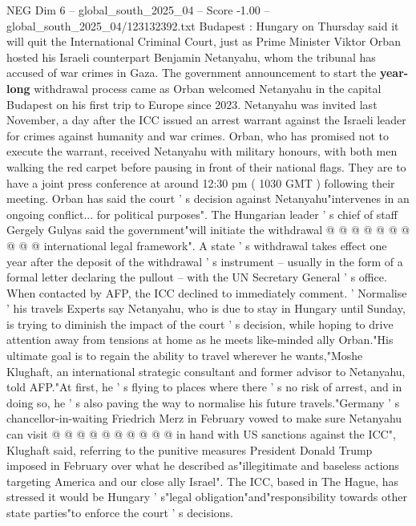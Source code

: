 \begin{textsample}{NEG Dim 6 – global\_south\_2025\_04 – Score -1.00 – global\_south\_2025\_04/123132392.txt}  \label{ex:f6_neg_168}
Budapest : Hungary on Thursday said it will quit the International Criminal Court, just as Prime Minister Viktor Orban hosted his Israeli counterpart Benjamin Netanyahu, whom the tribunal has accused of war crimes in Gaza.
The government announcement to start the \textbf{year-long} withdrawal process came as Orban welcomed Netanyahu in the capital Budapest on his first trip to Europe since 2023.
Netanyahu was invited last November, a day after the ICC issued an arrest warrant against the Israeli leader for crimes against humanity and war crimes.
Orban, who has promised not to execute the warrant, received Netanyahu with military honours, with both men walking the red carpet before pausing in front of their national flags.
They are to have a joint press conference at around 12:30 pm ( 1030 GMT ) following their meeting.
Orban has said the court ' s decision against Netanyahu"intervenes in an ongoing conflict... for political purposes".
The Hungarian leader ' s chief of staff Gergely Gulyas said the government"will initiate the withdrawal @ @ @ @ @ @ @ @ @ @ international legal framework".
A state ' s withdrawal takes effect one year after the deposit of the withdrawal ' s instrument -- usually in the form of a formal letter declaring the pullout -- with the UN Secretary General ' s office.
When contacted by AFP, the ICC declined to immediately comment. ' Normalise ' his travels Experts say Netanyahu, who is due to stay in Hungary until Sunday, is trying to diminish the impact of the court ' s decision, while hoping to drive attention away from tensions at home as he meets like-minded ally Orban."His ultimate goal is to regain the ability to travel wherever he wants,"Moshe Klughaft, an international strategic consultant and former advisor to Netanyahu, told AFP."At first, he ' s flying to places where there ' s no risk of arrest, and in doing so, he ' s also paving the way to normalise his future travels."Germany ' s chancellor-in-waiting Friedrich Merz in February vowed to make sure Netanyahu can visit @ @ @ @ @ @ @ @ @ @ in hand with US sanctions against the ICC", Klughaft said, referring to the punitive measures President Donald Trump imposed in February over what he described as"illegitimate and baseless actions targeting America and our close ally Israel".
The ICC, based in The Hague, has stressed it would be Hungary ' s"legal obligation"and"responsibility towards other state parties"to enforce the court ' s decisions.

\end{textsample}
